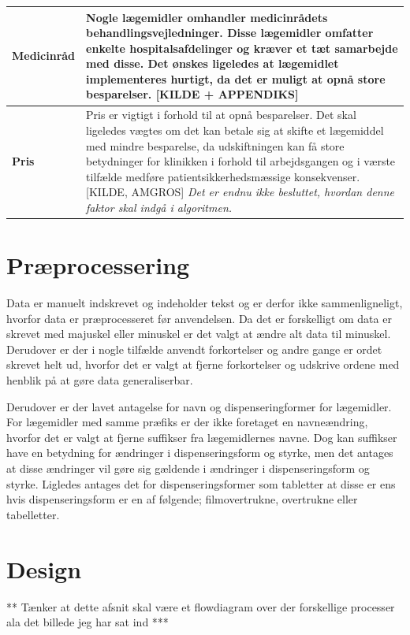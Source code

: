 \begin{table}[H]
\begin{tabular}{p{3.5cm} | p{11cm}}
\textbf{Medicinråd} & \vspace{0.1mm} Nogle lægemidler omhandler medicinrådets behandlingsvejledninger. Disse lægemidler omfatter enkelte hospitalsafdelinger og kræver et tæt samarbejde med disse. Det ønskes ligeledes at lægemidlet implementeres hurtigt, da det er muligt at opnå store besparelser. [KILDE + APPENDIKS]\\ \hline \vspace{0.1mm}
\textbf{Pris} & \vspace{0.1mm} Pris er vigtigt i forhold til at opnå besparelser. Det skal ligeledes vægtes om det kan betale sig at skifte et lægemiddel med mindre besparelse, da udskiftningen kan få store betydninger for klinikken i forhold til arbejdsgangen og i værste tilfælde medføre patientsikkerhedsmæssige konsekvenser. [KILDE, AMGROS] \textit{Det er endnu ikke besluttet, hvordan denne faktor skal indgå i algoritmen.} \\ \hline
\end{tabular}
\end{table}



\section{Præprocessering}
Data er manuelt indskrevet og indeholder tekst og er derfor ikke sammenligneligt, hvorfor data er præprocesseret før anvendelsen. Da det er forskelligt om data er skrevet med majuskel eller minuskel er det valgt at ændre alt data til minuskel. Derudover er der i nogle tilfælde anvendt forkortelser og andre gange er ordet skrevet helt ud, hvorfor det er valgt at fjerne forkortelser og udskrive ordene med henblik på at gøre data generaliserbar. 

Derudover er der lavet antagelse for navn og dispenseringformer for lægemidler. For lægemidler med samme præfiks er der ikke foretaget en navneændring, hvorfor det er valgt at fjerne suffikser fra lægemidlernes navne. Dog kan suffikser have en betydning for ændringer i dispenseringsform og styrke, men det antages at disse ændringer vil gøre sig gældende i ændringer i dispenseringsform og styrke. Ligledes antages det for dispenseringsformer som tabletter at disse er ens hvis dispenseringsform er en af følgende; filmovertrukne, overtrukne eller  tabelletter.





\section{Design}
** Tænker at dette afsnit skal være et flowdiagram over der forskellige processer ala det billede jeg har sat ind ***


